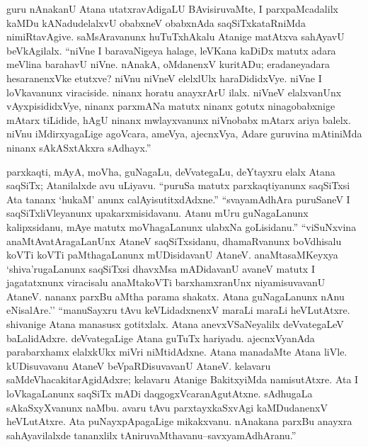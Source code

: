 guru nAnakanU Atana utatxravAdigaLU BAvisiruvaMte, I parxpaMcadalilx kaMDu kANadudelalxvU obabxneV obabxnAda saqSiTxkataRniMda nimiRtavAgive. saMsAravanunx huTuTxhAkalu Atanige matAtxva sahAyavU beVkAgilalx. ``niVne I baravaNigeya halage, leVKana kaDiDx matutx adara meVlina barahavU niVne. nAnakA, oMdanenxV kuritADu; eradaneyadara hesaranenxVke etutxve? niVnu niVneV elelxlUlx haraDididxVye. niVne I loVkavanunx viraciside. ninanx horatu anayxrArU ilalx. niVneV elalxvanUnx vAyxpisididxVye, ninanx parxmANa matutx ninanx gotutx ninagobabxnige mAtarx tiLidide, hAgU ninanx mwlayxvanunx niVnobabx mAtarx ariya balelx. niVnu iMdirxyagaLige agoVcara, ameVya, ajecnxVya, Adare guruvina mAtiniMda ninanx sAkASxtAkxra sAdhayx.''

parxkaqti, mAyA, moVha, guNagaLu, deVvategaLu, deYtayxru elalx Atana saqSiTx; Atanilalxde avu uLiyavu. ``puruSa matutx parxkaqtiyanunx saqSiTxsi Ata tananx `hukaM' anunx calAyisutitxdAdxne.'' ``svayamAdhAra puruSaneV I saqSiTxliVleyanunx upakarxmisidavanu. Atanu mUru guNagaLanunx kalipxsidanu, mAye matutx moVhagaLanunx ulabxNa goLisidanu.'' ``viSuNxvina anaMtAvatAragaLanUnx AtaneV saqSiTxsidanu, dhamaRvanunx boVdhisalu koVTi koVTi paMthagaLanunx mUDisidavanU AtaneV. anaMtasaMKeyxya `shiva'rugaLanunx saqSiTxsi dhavxMsa mADidavanU avaneV matutx I jagatatxnunx viracisalu anaMtakoVTi barxhamxranUnx niyamisuvavanU AtaneV. nananx parxBu aMtha parama shakatx. Atana guNagaLanunx nAnu eNisalAre.'' ``manuSayxru tAvu keVLidadxnenxV maraLi maraLi heVLutAtxre. shivanige Atana manasusx gotitxlalx. Atana anevxVSaNeyalilx deVvategaLeV baLalidAdxre. deVvategaLige Atana guTuTx hariyadu. ajecnxVyanAda parabarxhamx elalxkUkx miVri niMtidAdxne. Atana manadaMte Atana liVle. kUDisuvavanu AtaneV beVpaRDisuvavanU AtaneV. kelavaru saMdeVhacakitarAgidAdxre; kelavaru Atanige BakitxyiMda namisutAtxre. Ata I loVkagaLanunx  saqSiTx mADi daqgogxVcaranAgutAtxne. sAdhugaLa sAkaSxyXvanunx naMbu. avaru tAvu parxtayxkaSxvAgi kaMDudanenxV heVLutAtxre. Ata puNayxpApagaLige mikakxvanu. nAnakana parxBu anayxra sahAyavilalxde tananxlilx tAniruvaMthavanu--savxyamAdhAranu.''

